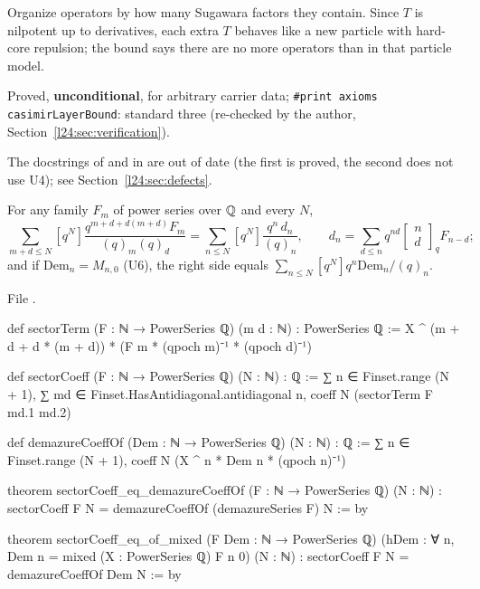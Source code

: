 \begin{physics}
Organize operators by how many Sugawara factors they contain. Since $T$ is nilpotent up to derivatives, each
extra $T$ behaves like a new particle with hard-core repulsion; the bound says there are no more operators than in
that particle model.
\end{physics}

\begin{status}
Proved, \textbf{unconditional}, for arbitrary carrier data; \texttt{\#print axioms casimirLayerBound}: standard three
(re-checked by the author, Section~\ref{l24:sec:verification}).
\end{status}

The docstrings of  and  in  are out of
date (the first is proved, the second does not use U4); see Section~\ref{l24:sec:defects}.

\begin{theorem}\label{l24:thm:D3}
For any family $F_m$ of power series over ${\mathbb{Q}}$ and every $N$,
\begin{equation*}
\sum_{m+d\le N}[q^N]\frac{q^{m+d+d(m+d)}F_m}{(q)_m(q)_d}=\sum_{n\le N}[q^N]\frac{q^n\,d_n}{(q)_n},\qquad
d_n=\sum_{d\le n}q^{nd}\begin{bmatrix}n\\d\end{bmatrix}_qF_{n-d};
\end{equation*}
and if $\mathrm{Dem}_n=M_{n,0}$ (U6), the right side equals $\sum_{n\le N}[q^N]q^n\mathrm{Dem}_n/(q)_n$.
\end{theorem}
\noindent File .
\begin{leancode}
def sectorTerm (F : ℕ → PowerSeries ℚ) (m d : ℕ) : PowerSeries ℚ :=
  X ^ (m + d + d * (m + d)) * (F m * (qpoch m)⁻¹ * (qpoch d)⁻¹)

def sectorCoeff (F : ℕ → PowerSeries ℚ) (N : ℕ) : ℚ :=
  ∑ n ∈ Finset.range (N + 1), ∑ md ∈ Finset.HasAntidiagonal.antidiagonal n, coeff N (sectorTerm F md.1 md.2)

def demazureCoeffOf (Dem : ℕ → PowerSeries ℚ) (N : ℕ) : ℚ :=
  ∑ n ∈ Finset.range (N + 1), coeff N (X ^ n * Dem n * (qpoch n)⁻¹)

theorem sectorCoeff_eq_demazureCoeffOf (F : ℕ → PowerSeries ℚ) (N : ℕ) :
    sectorCoeff F N = demazureCoeffOf (demazureSeries F) N := by

theorem sectorCoeff_eq_of_mixed (F Dem : ℕ → PowerSeries ℚ)
    (hDem : ∀ n, Dem n = mixed (X : PowerSeries ℚ) F n 0) (N : ℕ) :
    sectorCoeff F N = demazureCoeffOf Dem N := by
\end{leancode}

